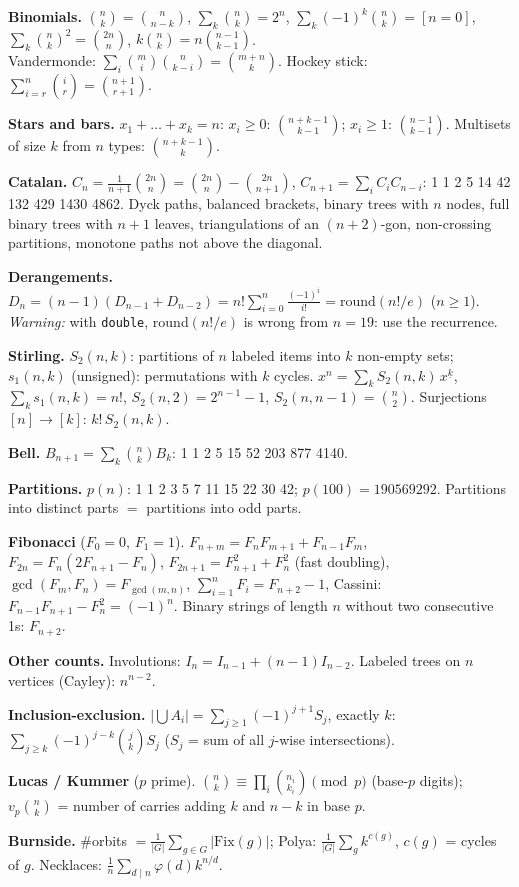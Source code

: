 {\scriptsize
\setlength{\parskip}{2pt}
\textbf{Binomials.}
$\binom{n}{k}=\binom{n}{n-k}$,\;
$\sum_k \binom{n}{k}=2^n$,\;
$\sum_k (-1)^k\binom{n}{k}=[n=0]$,\;
$\sum_k \binom{n}{k}^2=\binom{2n}{n}$,\;
$k\binom{n}{k}=n\binom{n-1}{k-1}$.\\
Vandermonde: $\sum_i \binom{m}{i}\binom{n}{k-i}=\binom{m+n}{k}$.\;
Hockey stick: $\sum_{i=r}^{n}\binom{i}{r}=\binom{n+1}{r+1}$.

\textbf{Stars and bars.} $x_1+\dots+x_k=n$:
$x_i\ge 0$: $\binom{n+k-1}{k-1}$;\; $x_i\ge 1$: $\binom{n-1}{k-1}$.\;
Multisets of size $k$ from $n$ types: $\binom{n+k-1}{k}$.

\textbf{Catalan.} $C_n=\frac{1}{n+1}\binom{2n}{n}=\binom{2n}{n}-\binom{2n}{n+1}$,
$C_{n+1}=\sum_i C_iC_{n-i}$: 1 1 2 5 14 42 132 429 1430 4862.
Dyck paths, balanced brackets, binary trees with $n$ nodes, full binary
trees with $n+1$ leaves, triangulations of an $(n+2)$-gon, non-crossing
partitions, monotone paths not above the diagonal.

\textbf{Derangements.} $D_n=(n-1)(D_{n-1}+D_{n-2})=n!\sum_{i=0}^{n}\frac{(-1)^i}{i!}
=\mathrm{round}(n!/e)$ ($n\ge1$).
\emph{Warning:} with \texttt{double}, round$(n!/e)$ is wrong from $n=19$: use
the recurrence.

\textbf{Stirling.} $S_2(n,k)$: partitions of $n$ labeled items into $k$
non-empty sets; $s_1(n,k)$ (unsigned): permutations with $k$ cycles.
$x^n=\sum_k S_2(n,k)\,x^{\underline{k}}$,\;
$\sum_k s_1(n,k)=n!$,\;
$S_2(n,2)=2^{n-1}-1$,\;
$S_2(n,n-1)=\binom{n}{2}$.\;
Surjections $[n]\to[k]$: $k!\,S_2(n,k)$.

\textbf{Bell.} $B_{n+1}=\sum_k\binom{n}{k}B_k$: 1 1 2 5 15 52 203 877 4140.

\textbf{Partitions.} $p(n)$: 1 1 2 3 5 7 11 15 22 30 42;\; $p(100)=190569292$.
Partitions into distinct parts $=$ partitions into odd parts.

\textbf{Fibonacci} ($F_0=0$, $F_1=1$).
$F_{n+m}=F_nF_{m+1}+F_{n-1}F_m$,\;
$F_{2n}=F_n(2F_{n+1}-F_n)$,\; $F_{2n+1}=F_{n+1}^2+F_n^2$ (fast doubling),\;
$\gcd(F_m,F_n)=F_{\gcd(m,n)}$,\;
$\sum_{i=1}^{n}F_i=F_{n+2}-1$,\;
Cassini: $F_{n-1}F_{n+1}-F_n^2=(-1)^n$.\;
Binary strings of length $n$ without two consecutive 1s: $F_{n+2}$.

\textbf{Other counts.} Involutions: $I_n=I_{n-1}+(n-1)I_{n-2}$.\;
Labeled trees on $n$ vertices (Cayley): $n^{n-2}$.

\textbf{Inclusion-exclusion.} $|\bigcup A_i|=\sum_{j\ge1}(-1)^{j+1}S_j$,\;
exactly $k$: $\sum_{j\ge k}(-1)^{j-k}\binom{j}{k}S_j$ ($S_j$ = sum of all
$j$-wise intersections).

\textbf{Lucas / Kummer} ($p$ prime). $\binom{n}{k}\equiv\prod_i\binom{n_i}{k_i}\pmod p$
(base-$p$ digits);\; $v_p\binom{n}{k}$ = number of carries adding $k$ and $n-k$
in base $p$.

\textbf{Burnside.} \#orbits $=\frac{1}{|G|}\sum_{g\in G}|\mathrm{Fix}(g)|$;\;
Polya: $\frac{1}{|G|}\sum_g k^{c(g)}$, $c(g)$ = cycles of $g$.\;
Necklaces: $\frac1n\sum_{d\mid n}\varphi(d)k^{n/d}$.
\par}
